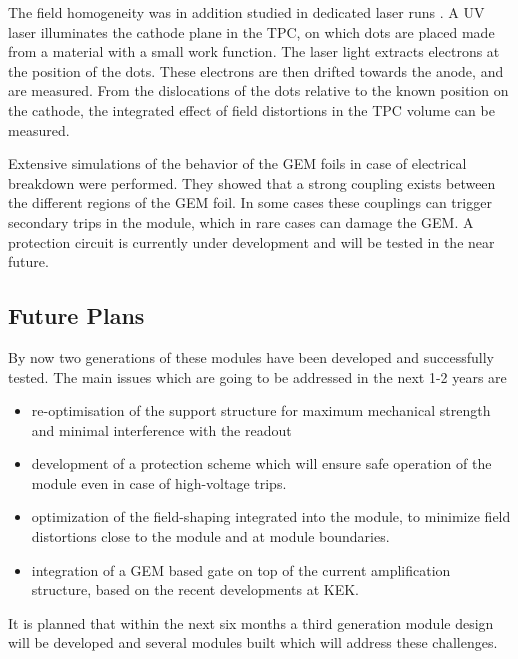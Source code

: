 The field homogeneity was in addition studied in dedicated laser runs \cite{Zenker:2014qra}. A UV laser illuminates the cathode plane in the TPC, on which dots are placed made from a material with a small work function. The laser light extracts electrons at the position of the dots. These electrons are then drifted towards the anode, and are measured. From the dislocations of the dots relative to the known position on the cathode, the integrated effect of field distortions in the TPC volume can be measured.

Extensive simulations of the behavior of the GEM foils in case of electrical breakdown were performed. They showed that a strong coupling exists between the different regions of the GEM foil. In some cases these couplings can trigger secondary trips in the module, which in rare cases can damage the GEM. A protection circuit is currently under development and will be tested in the near future.

\subsection{Future Plans}

By now two generations of these modules have been developed and successfully tested. The main issues which are going to be addressed in the next 1-2 years are
\begin{itemize}
\item re-optimisation of the support structure for maximum mechanical strength and minimal interference with the readout
\item development of a protection scheme which will ensure safe operation of the module even in case of high-voltage trips.
\item optimization of the field-shaping integrated into the module, to minimize field distortions close to the module and at module boundaries.
\item integration of a GEM based gate on top of the current amplification structure, based on the recent developments at KEK.
\end{itemize}
It is planned that within the next six months a third generation module design will be developed and several modules built which will address these challenges.

